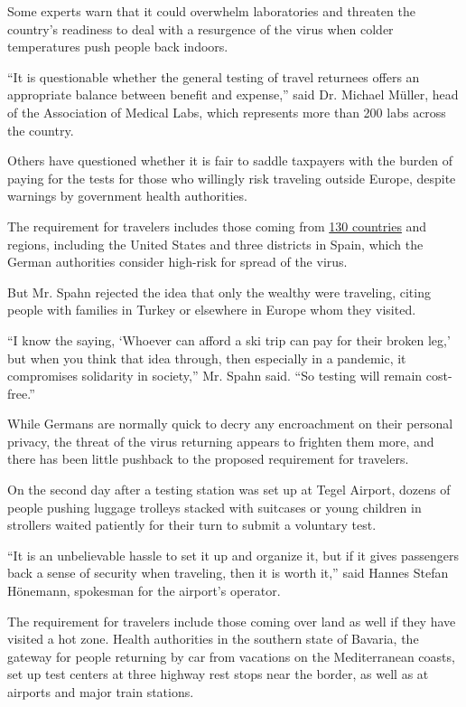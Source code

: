 Some experts warn that it could overwhelm laboratories and threaten the
country's readiness to deal with a resurgence of the virus when colder
temperatures push people back indoors.

``It is questionable whether the general testing of travel returnees
offers an appropriate balance between benefit and expense,'' said Dr.
Michael Müller, head of the Association of Medical Labs, which
represents more than 200 labs across the country.

Others have questioned whether it is fair to saddle taxpayers with the
burden of paying for the tests for those who willingly risk traveling
outside Europe, despite warnings by government health authorities.

The requirement for travelers includes those coming from
\href{https://www.rki.de/DE/Content/InfAZ/N/Neuartiges_Coronavirus/Risikogebiete_neu.html}{130
countries} and regions, including the United States and three districts
in Spain, which the German authorities consider high-risk for spread of
the virus.

But Mr. Spahn rejected the idea that only the wealthy were traveling,
citing people with families in Turkey or elsewhere in Europe whom they
visited.

``I know the saying, `Whoever can afford a ski trip can pay for their
broken leg,' but when you think that idea through, then especially in a
pandemic, it compromises solidarity in society,'' Mr. Spahn said. ``So
testing will remain cost-free.''

While Germans are normally quick to decry any encroachment on their
personal privacy, the threat of the virus returning appears to frighten
them more, and there has been little pushback to the proposed
requirement for travelers.

On the second day after a testing station was set up at Tegel Airport,
dozens of people pushing luggage trolleys stacked with suitcases or
young children in strollers waited patiently for their turn to submit a
voluntary test.

``It is an unbelievable hassle to set it up and organize it, but if it
gives passengers back a sense of security when traveling, then it is
worth it,'' said Hannes Stefan Hönemann, spokesman for the airport's
operator.

The requirement for travelers include those coming over land as well if
they have visited a hot zone. Health authorities in the southern state
of Bavaria, the gateway for people returning by car from vacations on
the Mediterranean coasts, set up test centers at three highway rest
stops near the border, as well as at airports and major train stations.

